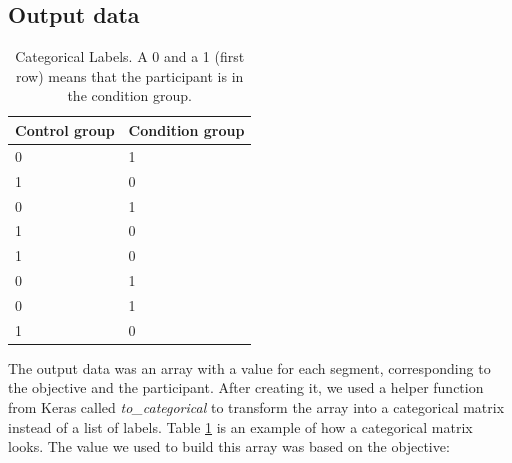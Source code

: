 \subsection{Output data}

\begin{table}[h]
  \begin{center}
    \begin{tabular}{| l | l |}
      \hline
      \textbf{Control group} & \textbf{Condition group}  \\ \hline
      0                    &  1                \\ \hline
      1                    &  0                \\ \hline
      0                    &  1                \\ \hline
      1                    &  0                \\ \hline
      1                    &  0                \\ \hline
      0                    &  1                \\ \hline
      0                    &  1                \\ \hline
      1                    &  0                \\ \hline
    \end{tabular}
    \caption{Categorical Labels. A 0 and a 1 (first row) means that the participant is in the condition group.}
    \label{table:categorical_labels}
  \end{center}
\end{table}

The output data was an array with a value for each segment, corresponding to the objective and the participant. After creating it, we used a helper function from Keras called \textit{to\_categorical} to transform the array into a categorical matrix instead of a list of labels. Table \ref{table:categorical_labels} is an example of how a categorical matrix looks. The value we used to build this array was based on the objective:

